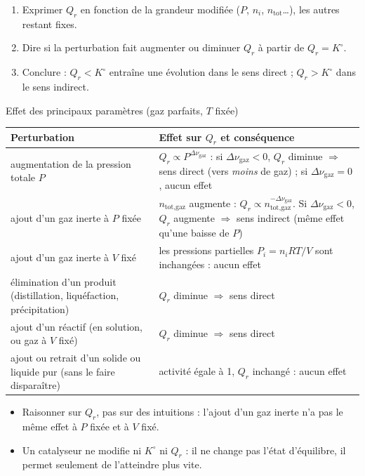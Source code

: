 \begin{methode}
\begin{enumerate}
  \item Exprimer $Q_r$ en fonction de la grandeur modifiée ($P$, $n_i$, $n_{\text{tot}}$\dots), les autres restant fixes.
  \item Dire si la perturbation fait augmenter ou diminuer $Q_r$ à partir de $Q_r = K^\circ$.
  \item Conclure : $Q_r < K^\circ$ entraîne une évolution dans le sens direct ; $Q_r > K^\circ$ dans le sens indirect.
\end{enumerate}
\end{methode}

\begin{resultat}{Effet des principaux paramètres (gaz parfaits, $T$ fixée)}
\renewcommand{\arraystretch}{1.35}
\begin{tabularx}{\linewidth}{>{\raggedright\arraybackslash}p{4.4cm} X}
\toprule
\textbf{Perturbation} & \textbf{Effet sur $Q_r$ et conséquence} \\ \midrule
augmentation de la pression totale $P$ & $Q_r\propto P^{\Delta\nu_{\text{gaz}}}$ : si $\Delta\nu_{\text{gaz}}<0$, $Q_r$ diminue $\Rightarrow$ sens direct (vers \emph{moins} de gaz) ; si $\Delta\nu_{\text{gaz}} = 0$, aucun effet \\
ajout d'un gaz inerte à $P$ fixée & $n_{\text{tot,gaz}}$ augmente : $Q_r\propto n_{\text{tot,gaz}}^{-\Delta\nu_{\text{gaz}}}$. Si $\Delta\nu_{\text{gaz}}<0$, $Q_r$ augmente $\Rightarrow$ sens indirect (même effet qu'une baisse de $P$) \\
ajout d'un gaz inerte à $V$ fixé & les pressions partielles $P_i = n_iRT/V$ sont inchangées : aucun effet \\
élimination d'un produit (distillation, liquéfaction, précipitation) & $Q_r$ diminue $\Rightarrow$ sens direct \\
ajout d'un réactif (en solution, ou gaz à $V$ fixé) & $Q_r$ diminue $\Rightarrow$ sens direct \\
ajout ou retrait d'un solide ou liquide pur (sans le faire disparaître) & activité égale à 1, $Q_r$ inchangé : aucun effet \\
\bottomrule
\end{tabularx}
\end{resultat}

\begin{pieges}
\begin{itemize}
  \item Raisonner sur $Q_r$, pas sur des intuitions : l'ajout d'un gaz inerte n'a pas le même effet à $P$ fixée et à $V$ fixé.
  \item Un catalyseur ne modifie ni $K^\circ$ ni $Q_r$ : il ne change pas l'état d'équilibre, il permet seulement de l'atteindre plus vite.
\end{itemize}
\end{pieges}

